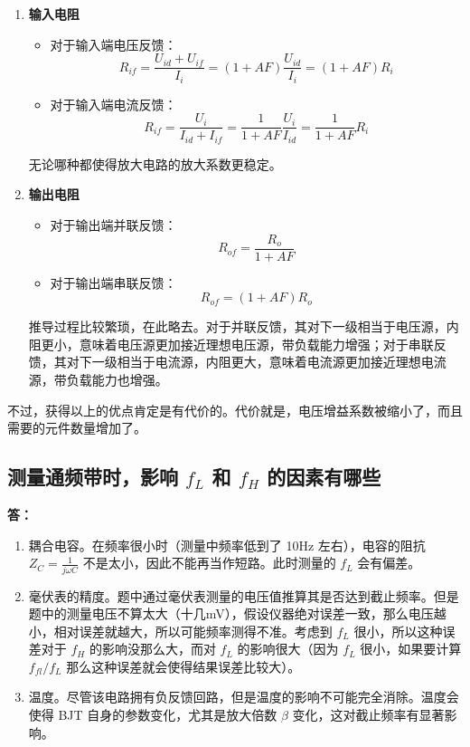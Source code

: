 \documentclass[a4paper,11pt,UTF8]{ctexart}
\newcommand{\p}{\par}
\newcommand{\np}{\par\noindent}
\begin{document}
\begin{enumerate}
 \item\textbf{输入电阻}
 	\begin{itemize}
 	 \item 对于输入端电压反馈：
 	 \[ R_{if}=\frac{U_{id}+U_{if}}{I_i}=(1+AF)\frac{U_{id}}{I_i}
 	 =(1+AF)R_i
 	 \]
 	 \item 对于输入端电流反馈：
 	 \[ R_{if}=\frac{U_i}{I_{id}+I_{if}}=\frac{1}{1+AF}
 	 \frac{U_{i}}{I_{id}}
 	 =\frac{1}{1+AF}R_i
 	 \]
 	\end{itemize}
 	\p 无论哪种都使得放大电路的放大系数更稳定。
 	
 	\item\textbf{输出电阻}
 	 \begin{itemize}
 	  \item 对于输出端并联反馈：
 	  \[ R_{of}=\frac{R_o}{1+AF} \]
 	  \item 对于输出端串联反馈：
 	  \[ R_{of}=(1+AF)R_o \]
 	 \end{itemize}
 	 \p 推导过程比较繁琐，在此略去。对于并联反馈，其对下一级相当于电压源，内阻更小，意味着电压源更加接近理想电压源，带负载能力增强；对于串联反馈，其对下一级相当于电流源，内阻更大，意味着电流源更加接近理想电流源，带负载能力也增强。
\end{enumerate}
\np\phantom{a}
\p 不过，获得以上的优点肯定是有代价的。代价就是，电压增益系数被缩小了，而且需要的元件数量增加了。

\subsection{测量通频带时，影响 $f_L$ 和 $f_H$ 的因素有哪些}
\np\textbf{答：}
\begin{enumerate}
 \item 耦合电容。在频率很小时（测量中频率低到了 10Hz 左右），电容的阻抗 $Z_C=\frac{1}{j\omega C}$ 不是太小，因此不能再当作短路。此时测量的 $f_L$ 会有偏差。
 \item 毫伏表的精度。题中通过毫伏表测量的电压值推算其是否达到截止频率。但是题中的测量电压不算太大（十几mV），假设仪器绝对误差一致，那么电压越小，相对误差就越大，所以可能频率测得不准。考虑到 $f_L$ 很小，所以这种误差对于 $f_H$ 的影响没那么大，而对 $f_L$ 的影响很大（因为 $f_L$ 很小，如果要计算 $f_{fl}/f_L$ 那么这种误差就会使得结果误差比较大）。
 \item 温度。尽管该电路拥有负反馈回路，但是温度的影响不可能完全消除。温度会使得 BJT 自身的参数变化，尤其是放大倍数 $\beta$ 变化，这对截止频率有显著影响。
\end{enumerate}
\end{document}
